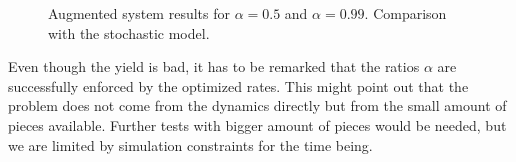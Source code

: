			
				\begin{figure}[h!]
					\centering
					\caption{Augmented system results for $\alpha=0.5$ and $\alpha=0.99$. Comparison with the stochastic model.}
				\label{fig:img_augm_stochphys_otheralpha} %
				\end{figure}
				
			Even though the yield is bad, it has to be remarked that the ratios $\alpha$ are successfully enforced by the optimized rates. This might point out that the problem does not come from the dynamics directly but from the small amount of pieces available. Further tests with bigger amount of pieces would be needed, but we are limited by simulation constraints for the time being.
			
